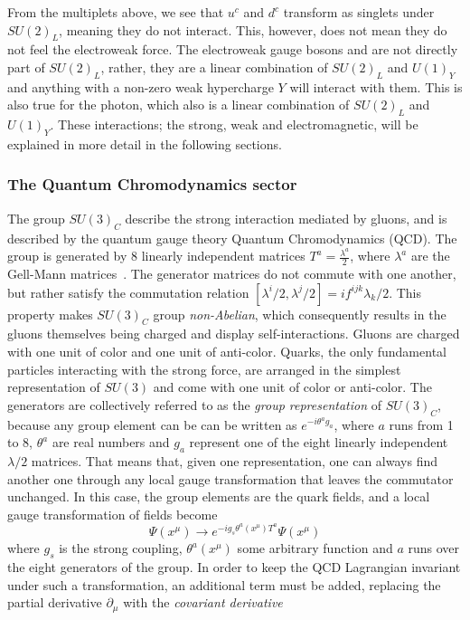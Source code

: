 From the multiplets above, we see that $u^c$ and $d^c$ transform as singlets under $SU(2)_L$, meaning they do not interact. This, however, does not mean they do not feel the electroweak force. The electroweak gauge bosons \PW and \PZ are not directly part of $SU(2)_L$, rather, they are a linear combination of $SU(2)_L$ and $U(1)_Y$ and anything with a non-zero weak hypercharge $Y$ will interact with them. This is also true for the photon, which also is a linear combination of $SU(2)_L$ and $U(1)_Y$.\newline
These interactions; the strong, weak and electromagnetic, will be explained in more detail in the following sections.

\subsubsection{The Quantum Chromodynamics sector}
\label{sec:theory:qcd}
The group $SU(3)_C$ describe the strong interaction mediated by gluons, and is described by the quantum gauge theory Quantum Chromodynamics (QCD). The group is generated by 8 linearly independent matrices $T^a=\frac{\lambda^a}{2}$, where $\lambda^a$ are the Gell-Mann matrices~\cite{PhysRev.125.1067}. The generator matrices do not commute with one another, but rather satisfy the commutation relation $[\lambda^i/2,\lambda^j/2]=i f^{ijk} \lambda_k/2$. This property makes $SU(3)_C$ group \emph{non-Abelian}, which consequently results in the gluons themselves being charged and display self-interactions. Gluons are charged with one unit of color and one unit of anti-color. Quarks, the only fundamental particles interacting with the strong force, are arranged in the simplest representation of $SU(3)$ and come with one unit of color or anti-color. \newline
The generators are collectively referred to as the \emph{group representation} of $SU(3)_C$, because any group element can be can be written as $e^{-i\theta^a g_a}$, where $a$ runs from 1 to 8, $\theta^a$ are real numbers and $g_a$ represent one of the eight linearly independent $\lambda/2$ matrices. That means that, given one representation, one can always find another one through any local gauge transformation that leaves the commutator unchanged.  
In this case, the group elements are the quark fields, and a local gauge transformation of fields become
\begin{equation}
  \Psi(x^{\mu}) \rightarrow e^{ -i g_s \theta^a(x^{\mu}) T^a}\Psi(x^{\mu})
\end{equation}
where $g_s$ is the strong coupling, $\theta^a(x^{\mu})$ some arbitrary function and $a$ runs over the eight generators of the group. In order to keep the QCD Lagrangian invariant under such a transformation, an additional term must be added, replacing the partial derivative $\partial_{\mu}$ with the \emph{covariant derivative}
